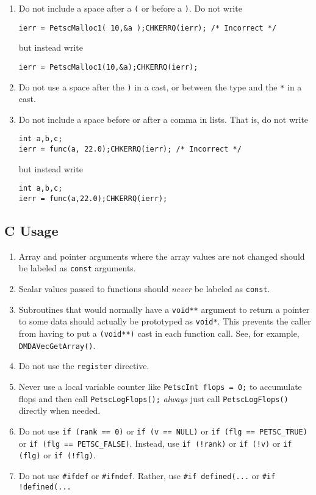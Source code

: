 \begin{enumerate}
\item Do not include a space after a \lstinline{(} or before a \lstinline{)}. Do not write
\begin{lstlisting}
ierr = PetscMalloc1( 10,&a );CHKERRQ(ierr); /* Incorrect */
\end{lstlisting}
but instead write
\begin{lstlisting}
ierr = PetscMalloc1(10,&a);CHKERRQ(ierr);
\end{lstlisting}
\item Do not use a space after the \lstinline{)} in a cast, or between the type and the \lstinline{*} in a cast.
\item Do not include a  space before or after a comma in lists.
That is, do not write
\begin{lstlisting}
int a,b,c;
ierr = func(a, 22.0);CHKERRQ(ierr); /* Incorrect */
\end{lstlisting}
but instead write
\begin{lstlisting}
int a,b,c;
ierr = func(a,22.0);CHKERRQ(ierr);
\end{lstlisting}
\end{enumerate}

\subsection{C Usage}
\begin{enumerate}
\item Array and pointer arguments where the array values are not changed should be labeled as \lstinline{const} arguments.
\item Scalar values passed to functions should {\em never} be labeled as \lstinline{const}.
\item Subroutines that would normally have a \lstinline{void**} argument to return a pointer to some data should actually be prototyped as \lstinline{void*}. This prevents the caller from having to put a \lstinline{(void**)} cast in each function call. See, for example, \lstinline{DMDAVecGetArray()}.
\item Do not use the \lstinline{register} directive.
\item Never use a local variable counter like \lstinline{PetscInt flops = 0;} to accumulate flops and then call \lstinline{PetscLogFlops();} {\em always} just
  call \lstinline{PetscLogFlops()} directly when needed.
\item Do not use \lstinline{if (rank == 0)} or \lstinline{if (v == NULL)} or \lstinline{if (flg == PETSC_TRUE)} or \lstinline{if (flg == PETSC_FALSE)}.
Instead, use \lstinline{if (!rank)} or \lstinline{if (!v)} or \lstinline{if (flg)} or \lstinline{if (!flg)}.
\item Do not use \lstinline{#ifdef} or \lstinline{#ifndef}. Rather, use \lstinline{#if defined(...} or \lstinline{#if !defined(...}
\end{enumerate}

